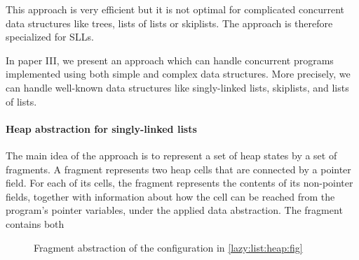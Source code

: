 
This approach is very efficient but it is not optimal for complicated concurrent data structures like trees, lists of lists or skiplists. The  approach is therefore specialized for SLLs. 

In paper III, we present an approach which can handle concurrent programs implemented using both simple and complex data structures. More precisely, we can handle well-known data structures like singly-linked lists, skiplists, and lists of lists. 
\paragraph{Heap abstraction for singly-linked lists}
The main idea of the approach is to represent a set of heap states by a set
of fragments. A fragment represents two heap cells that are connected by a pointer
field. For each of its cells, the fragment represents the contents of its non-pointer fields,
together with information about how the cell can be reached from the program’s pointer
variables, under the applied data abstraction. The fragment contains both
 \begin{figure}
\center
	
\caption{Fragment abstraction of the configuration in \ref{lazy:list:heap:fig}}
\label{fig:sllabs}
\end{figure}
 
